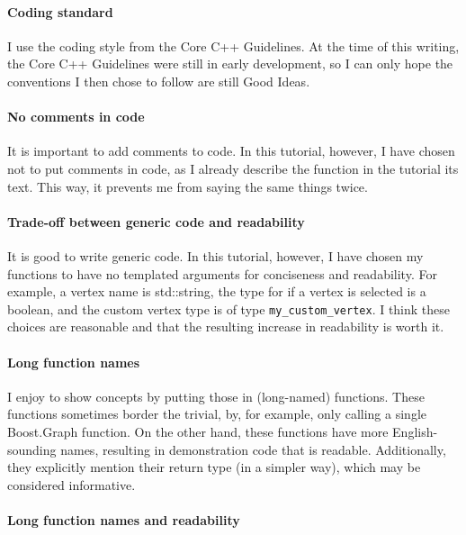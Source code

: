 \paragraph{Coding standard}

I use the coding style from the Core C++ Guidelines.
At the time of this writing, the Core C++ Guidelines were still in early
development, so I can only hope the conventions I then chose to follow
are still Good Ideas.

\paragraph{No comments in code}

It is important to add comments to code.
In this tutorial, however, I have chosen not to put comments in code, as
I already describe the function in the tutorial its text.
This way, it prevents me from saying the same things twice.

\paragraph{Trade-off between generic code and readability}

It is good to write generic code.
In this tutorial, however, I have chosen my functions to have no templated
arguments for conciseness and readability.
For example, a vertex name is std::string, the type for if a vertex is
selected is a boolean, and the custom vertex type is of type \verb;my_custom_vertex;.
I think these choices are reasonable and that the resulting increase in
readability is worth it.

\paragraph{Long function names}

I enjoy to show concepts by putting those in (long-named) functions.
These functions sometimes border the trivial, by, for example, only calling
a single Boost.Graph function.
On the other hand, these functions have more English-sounding names, resulting
in demonstration code that is readable.
Additionally, they explicitly mention their return type (in a simpler way),
which may be considered informative.

\paragraph{Long function names and readability}


